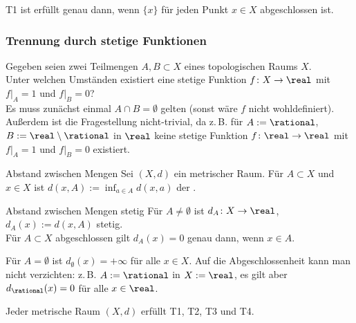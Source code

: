 \begin{Bem}
    T1 ist erfüllt genau dann, wenn $\{x\}$ für jeden Punkt $x \in X$
    abgeschlossen ist.
\end{Bem}

\subsubsection{%
    Trennung durch stetige Funktionen%
}

\begin{Bem}
    Gegeben seien zwei Teilmengen $A, B \subset X$ eines
    topologischen Raums $X$. \\
    Unter welchen Umständen existiert eine stetige Funktion
    $f\colon X \rightarrow \real$ mit $f|_A = 1$ und $f|_B = 0$? \\
    Es muss zunächst einmal $A \cap B = \emptyset$ gelten
    (sonst wäre $f$ nicht wohldefiniert). \\
    Außerdem ist die Fragestellung nicht-trivial, da z.\,B. für
    $A := \rational$, $B := \real \setminus \rational$ in $\real$
    keine stetige Funktion $f\colon \real \rightarrow \real$
    mit $f|_A = 1$ und $f|_B = 0$ existiert.
\end{Bem}

\begin{Def}{Abstand zwischen Mengen}
    Sei $(X, d)$ ein metrischer Raum.
    Für $A \subset X$ und $x \in X$ ist $d(x, A) := \inf_{a \in A} d(x, a)$
    der .
\end{Def}

\begin{Lemma}{Abstand zwischen Mengen stetig}
    Für $A \not= \emptyset$ ist $d_A\colon X \rightarrow \real$,
    $d_A(x) := d(x, A)$ stetig. \\
    Für $A \subset X$ abgeschlossen gilt $d_A(x) = 0$ genau dann, wenn
    $x \in A$.
\end{Lemma}

\begin{Bem}
    Für $A = \emptyset$ ist $d_\emptyset(x) = +\infty$ für alle $x \in X$.
    Auf die Abgeschlossenheit kann man nicht verzichten:
    z.\,B. $A := \rational$ in $X := \real$, es gilt aber $d_\rational(x) = 0$
    für alle $x \in \real$.
\end{Bem}

\begin{Kor}
    Jeder metrische Raum $(X, d)$ erfüllt T1, T2, T3 und T4.
\end{Kor}

